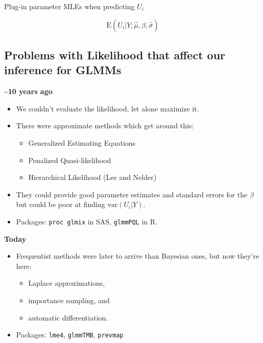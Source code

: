 \documentclass[
  openany]{book}
\providecommand{\tightlist}{%
  \setlength{\itemsep}{0pt}\setlength{\parskip}{0pt}}
\begin{document}
Plug-in parameter MLEs when predicting \(U_i\)

\[
\text{E}(U_i |Y; \hat{\mu},\hat{\beta}, \hat{\sigma})
\]

\hypertarget{problems-with-likelihood-that-affect-our-inference-for-glmms}{%
\subsection{Problems with Likelihood that affect our inference for GLMMs}\label{problems-with-likelihood-that-affect-our-inference-for-glmms}}

\textbf{\textasciitilde10 years ago}

\begin{itemize}
\item
  We couldn't evaluate the likelihood, let alone maximize it.
\item
  There were approximate methods which get around this:

  \begin{itemize}
  \tightlist
  \item
    Generalized Estimating Equations
  \item
    Penalized Quasi-likelihood
  \item
    Hierarchical Likelihood (Lee and Nelder)
  \end{itemize}
\item
  They could provide good parameter estimates and standard errors for the \(\beta\) but could be poor at finding \(\text{var}(U_i | Y)\).
\item
  Packages: \texttt{proc\ glmix} in SAS, \texttt{glmmPQL} in R.
\end{itemize}

\textbf{Today}

\begin{itemize}
\item
  Frequentist methods were later to arrive than Bayesian ones, but now they're here:

  \begin{itemize}
  \tightlist
  \item
    Laplace approximations,
  \item
    importance sampling, and
  \item
    automatic differentiation.
  \end{itemize}
\item
  Packages: \texttt{lme4}, \texttt{glmmTMB}, \texttt{prevmap}
\end{itemize}
\end{document}
